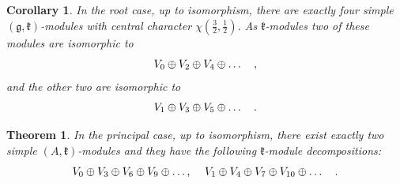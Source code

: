 \documentclass[12pt]{amsart}
\theoremstyle{plain} %
\newtheorem{theorem}[definition]{Theorem}
\newtheorem{corollary}[definition]{Corollary}
\newcommand{\kk}{\mathfrak{k}}
\renewcommand{\gg}{\mathfrak{g}}
\newcommand{\half}{\frac{1}{2}}
\newcommand{\threehalfs}{\frac{3}{2}}
\begin{document}
\begin{corollary} \label{cor35}\relax
In the root case, up to isomorphism, there are exactly four simple $(\gg,\kk)$-modules with central character $\chi(\threehalfs,\half)$. As $\kk$-modules two of these modules are isomorphic to
\begin{equation}
V_{0}\oplus V_{2}\oplus V_{4}\oplus\dots\quad,
\notag\end{equation}
and the other two are isomorphic to
\begin{equation}
V_{1}\oplus V_{3}\oplus V_{5}\oplus\dots\quad .
\notag\end{equation}
\end{corollary}

\begin{theorem} \label{th600}\relax
In the principal case, up to isomorphism, there exist exactly two simple $(A,\kk)$-modules and they have the following $\kk$-module decompositions:
\begin{equation}
V_{0}\oplus V_{3}\oplus V_{6}\oplus V_{9}\oplus\text{\dots , }\quad V_{1}\oplus V_{4}\oplus V_{7}\oplus V_{10}\oplus\dots\quad .
\notag\end{equation}
\end{theorem}
\end{document}
